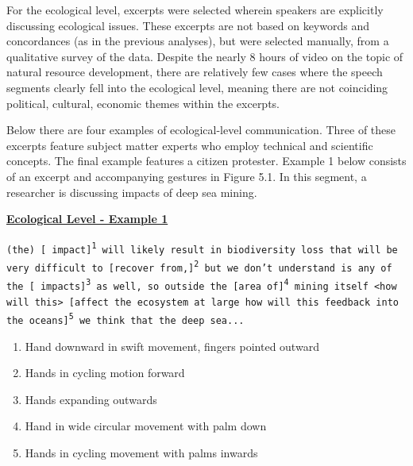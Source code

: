 For the ecological level, excerpts were selected wherein speakers are explicitly discussing ecological issues. These excerpts are not based on keywords and concordances (as in the previous analyses), but were selected manually, from a qualitative survey of the data. Despite the nearly 8 hours of video on the topic of natural resource development, there are relatively few cases where the speech segments clearly fell into the ecological level, meaning there are not coinciding political, cultural, economic themes within the excerpts.

Below there are four examples of ecological-level communication. Three of these excerpts feature subject matter experts who employ technical and scientific concepts. The final example features a citizen protester. Example 1 below consists of an excerpt and accompanying gestures in Figure 5.1. In this segment, a researcher is discussing impacts of deep sea mining.

\textbf{\underline{Ecological Level - Example 1}}

\begin{footnotesize}

\texttt{(the) [ impact]\textsuperscript{1} will likely result in biodiversity loss that will be very difficult to [recover from,]\textsuperscript{2} but we  don't understand is any of the [ impacts]\textsuperscript{3} as well, so outside the [area of]\textsuperscript{4} mining itself <how will this> [affect the ecosystem at large how will this feedback into the oceans]\textsuperscript{5} we think that the deep sea...}

\end{footnotesize}

\begin{footnotesize}
\begin{enumerate}
   \item Hand downward in swift movement, fingers pointed outward
   \item Hands in cycling motion forward
   \item Hands expanding outwards
   \item Hand in wide circular movement with palm down
   \item Hands in cycling movement with palms inwards
\end{enumerate}
\end{footnotesize}

